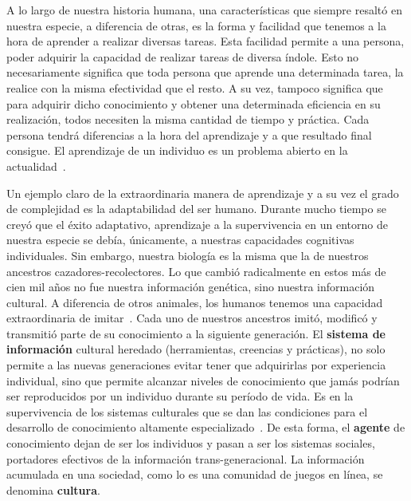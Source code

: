 \documentclass[11pt,twoside,spanish]{report} %
\begin{document}
A lo largo de nuestra historia humana, una caracter\'isticas que siempre resalt\'o en nuestra especie, a diferencia de otras, es la forma y facilidad que tenemos a la hora de aprender a realizar diversas tareas.
Esta facilidad permite a una persona, poder adquirir la capacidad de realizar tareas de diversa \'indole.
Esto no necesariamente significa que toda persona que aprende una determinada tarea, la realice con la misma efectividad que el resto.
A su vez, tampoco significa que para adquirir dicho conocimiento y obtener una determinada eficiencia en su realizaci\'on, todos necesiten la misma cantidad de tiempo y pr\'actica.
Cada persona tendr\'a diferencias a la hora del aprendizaje y a que resultado final consigue.
El aprendizaje de un individuo es un problema abierto en la actualidad~\cite{Beheim2014, derex2015-foundationsOfTheHumanCulturalNiche, gariepy2014-neuroSocialLearning, glowacki2017-subsistenceStyleShapeSocialLearningStrategies}.

Un ejemplo claro de la extraordinaria manera de aprendizaje y a su vez el grado de complejidad es la adaptabilidad del ser humano.
Durante mucho tiempo se crey\'o que el \'exito adaptativo, aprendizaje a la supervivencia en un entorno de nuestra especie se deb\'ia, \'unicamente, a nuestras capacidades cognitivas individuales.
Sin embargo, nuestra biolog\'ia es la misma que la de nuestros ancestros cazadores-recolectores.
Lo que cambi\'o radicalmente en estos m\'as de cien mil a\~nos no fue nuestra informaci\'on gen\'etica, sino nuestra informaci\'on cultural.
A diferencia de otros animales, los humanos tenemos una capacidad extraordinaria de imitar~\cite{richerson2010-geneCultureCoevolution}.
Cada uno de nuestros ancestros imit\'o, modific\'o y transmiti\'o parte de su conocimiento a la siguiente generaci\'on.
El \textbf{sistema de informaci\'on} cultural heredado (herramientas, creencias y pr\'acticas), no solo permite a las nuevas generaciones evitar tener que adquirirlas por experiencia individual, sino que permite alcanzar niveles de conocimiento que jam\'as podr\'ian ser reproducidos por un individuo durante su per\'iodo de vida.
Es en la supervivencia de los sistemas culturales que se dan las condiciones para el desarrollo de conocimiento altamente especializado~\cite{Boyd2011}.
De esta forma, el \textbf{agente} de conocimiento dejan de ser los individuos y pasan a ser los sistemas sociales, portadores efectivos de la informaci\'on trans-generacional.
La informaci\'on acumulada en una sociedad, como lo es una comunidad de juegos en l\'inea, se denomina \textbf{cultura}.
\end{document}
